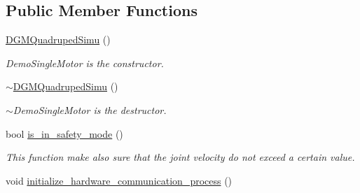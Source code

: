 \subsection*{Public Member Functions}
\begin{DoxyCompactItemize}
\item 
\hyperlink{classdg__blmc__robots_1_1DGMQuadrupedSimu_a6dd0768f9887c92a9fe26839b73771a3}{D\+G\+M\+Quadruped\+Simu} ()\hypertarget{classdg__blmc__robots_1_1DGMQuadrupedSimu_a6dd0768f9887c92a9fe26839b73771a3}{}\label{classdg__blmc__robots_1_1DGMQuadrupedSimu_a6dd0768f9887c92a9fe26839b73771a3}

\begin{DoxyCompactList}\small\item\em Demo\+Single\+Motor is the constructor. \end{DoxyCompactList}\item 
\hyperlink{classdg__blmc__robots_1_1DGMQuadrupedSimu_a5aabe831d173f9fc58c420b0ba33330f}{$\sim$\+D\+G\+M\+Quadruped\+Simu} ()\hypertarget{classdg__blmc__robots_1_1DGMQuadrupedSimu_a5aabe831d173f9fc58c420b0ba33330f}{}\label{classdg__blmc__robots_1_1DGMQuadrupedSimu_a5aabe831d173f9fc58c420b0ba33330f}

\begin{DoxyCompactList}\small\item\em $\sim$\+Demo\+Single\+Motor is the destructor. \end{DoxyCompactList}\item 
bool \hyperlink{classdg__blmc__robots_1_1DGMQuadrupedSimu_a89ae101b6a85455885d2ef9d7441941c}{is\+\_\+in\+\_\+safety\+\_\+mode} ()\hypertarget{classdg__blmc__robots_1_1DGMQuadrupedSimu_a89ae101b6a85455885d2ef9d7441941c}{}\label{classdg__blmc__robots_1_1DGMQuadrupedSimu_a89ae101b6a85455885d2ef9d7441941c}

\begin{DoxyCompactList}\small\item\em This function make also sure that the joint velocity do not exceed a certain value. \end{DoxyCompactList}\item 
void \hyperlink{classdg__blmc__robots_1_1DGMQuadrupedSimu_a1a5010a4279e2118c6d500427a223d07}{initialize\+\_\+hardware\+\_\+communication\+\_\+process} ()\hypertarget{classdg__blmc__robots_1_1DGMQuadrupedSimu_a1a5010a4279e2118c6d500427a223d07}{}\label{classdg__blmc__robots_1_1DGMQuadrupedSimu_a1a5010a4279e2118c6d500427a223d07}


\end{DoxyCompactItemize}
